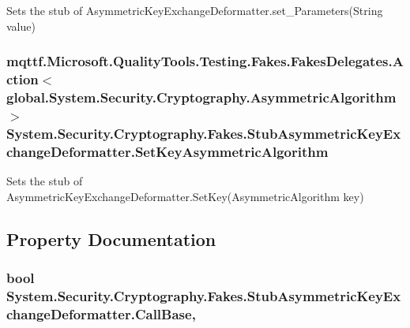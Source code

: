 Sets the stub of Asymmetric\-Key\-Exchange\-Deformatter.\-set\-\_\-\-Parameters(\-String value)

\hypertarget{class_system_1_1_security_1_1_cryptography_1_1_fakes_1_1_stub_asymmetric_key_exchange_deformatter_a86e331ed40cca45cd060c47d70d740d6}{
\subsubsection[{Set\-Key\-Asymmetric\-Algorithm}]{\setlength{\rightskip}{0pt plus 5cm}mqttf.\-Microsoft.\-Quality\-Tools.\-Testing.\-Fakes.\-Fakes\-Delegates.\-Action$<$global.\-System.\-Security.\-Cryptography.\-Asymmetric\-Algorithm$>$ System.\-Security.\-Cryptography.\-Fakes.\-Stub\-Asymmetric\-Key\-Exchange\-Deformatter.\-Set\-Key\-Asymmetric\-Algorithm}}\label{class_system_1_1_security_1_1_cryptography_1_1_fakes_1_1_stub_asymmetric_key_exchange_deformatter_a86e331ed40cca45cd060c47d70d740d6}


Sets the stub of Asymmetric\-Key\-Exchange\-Deformatter.\-Set\-Key(\-Asymmetric\-Algorithm key)



\subsection{Property Documentation}
\hypertarget{class_system_1_1_security_1_1_cryptography_1_1_fakes_1_1_stub_asymmetric_key_exchange_deformatter_ae333027c90b2f9801e102af62917fcfe}{
\subsubsection[{Call\-Base}]{\setlength{\rightskip}{0pt plus 5cm}bool System.\-Security.\-Cryptography.\-Fakes.\-Stub\-Asymmetric\-Key\-Exchange\-Deformatter.\-Call\-Base\hspace{0.3cm}{\ttfamily [get]}, {\ttfamily [set]}}}\label{class_system_1_1_security_1_1_cryptography_1_1_fakes_1_1_stub_asymmetric_key_exchange_deformatter_ae333027c90b2f9801e102af62917fcfe}



